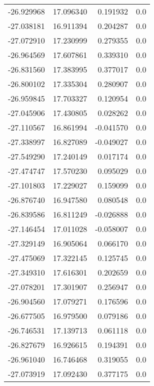 \begin{tabular}{rrrr}
      -26.929968 &        17.096340 &    0.191932 &   0.0 \\
      -27.038181 &        16.911394 &    0.204287 &   0.0 \\
      -27.072910 &        17.230999 &    0.279355 &   0.0 \\
      -26.964569 &        17.607861 &    0.339310 &   0.0 \\
      -26.831560 &        17.383995 &    0.377017 &   0.0 \\
      -26.800102 &        17.335304 &    0.280907 &   0.0 \\
      -26.959845 &        17.703327 &    0.120954 &   0.0 \\
      -27.045906 &        17.430805 &    0.028262 &   0.0 \\
      -27.110567 &        16.861994 &   -0.041570 &   0.0 \\
      -27.338997 &        16.827089 &   -0.049027 &   0.0 \\
      -27.549290 &        17.240149 &    0.017174 &   0.0 \\
      -27.474747 &        17.570230 &    0.095029 &   0.0 \\
      -27.101803 &        17.229027 &    0.159099 &   0.0 \\
      -26.876740 &        16.947580 &    0.080548 &   0.0 \\
      -26.839586 &        16.811249 &   -0.026888 &   0.0 \\
      -27.146454 &        17.011028 &   -0.058007 &   0.0 \\
      -27.329149 &        16.905064 &    0.066170 &   0.0 \\
      -27.475069 &        17.322145 &    0.125745 &   0.0 \\
      -27.349310 &        17.616301 &    0.202659 &   0.0 \\
      -27.078201 &        17.301907 &    0.256947 &   0.0 \\
      -26.904560 &        17.079271 &    0.176596 &   0.0 \\
      -26.677505 &        16.979500 &    0.079186 &   0.0 \\
      -26.746531 &        17.139713 &    0.061118 &   0.0 \\
      -26.827679 &        16.926615 &    0.194391 &   0.0 \\
      -26.961040 &        16.746468 &    0.319055 &   0.0 \\
      -27.073919 &        17.092430 &    0.377175 &   0.0 \\

\end{tabular}
